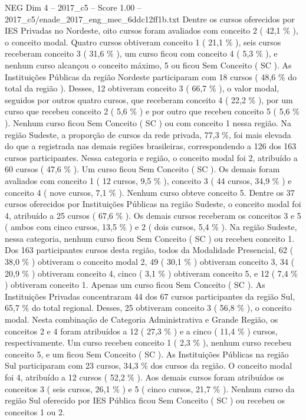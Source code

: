 \begin{textsample}{NEG Dim 4 – 2017\_c5 – Score 1.00 – 2017\_c5/enade\_2017\_eng\_mec\_6ddc12ff1b.txt}
Dentre os cursos oferecidos por IES Privadas no Nordeste, oito cursos foram avaliados com conceito 2 ( 42,1 \% ), o conceito modal.
Quatro cursos obtiveram conceito 1 ( 21,1 \% ), seis cursos receberam conceito 3 ( 31,6 \% ), um curso ficou com conceito 4 ( 5,3 \% ), e nenhum curso alcançou o conceito máximo, 5 ou ficou Sem Conceito ( SC ).
As Instituições Públicas da região Nordeste participaram com 18 cursos ( 48,6 \% do total da região ).
Desses, 12 obtiveram conceito 3 ( 66,7 \% ), o valor modal, seguidos por outros quatro cursos, que receberam conceito 4 ( 22,2 \% ), por um curso que recebeu conceito 2 ( 5,6 \% ) e por outro que recebeu conceito 5 ( 5,6 \% ).
Nenhum curso ficou Sem Conceito ( SC ) ou com conceito 1 nessa região.
Na região Sudeste, a proporção de cursos da rede privada, 77,3 \%, foi mais elevada do que a registrada nas demais regiões brasileiras, correspondendo a 126 dos 163 cursos participantes.
Nessa categoria e região, o conceito modal foi 2, atribuído a 60 cursos ( 47,6 \% ).
Um curso ficou Sem Conceito ( SC ).
Os demais foram avaliados com conceito 1 ( 12 cursos, 9,5 \% ), conceito 3 ( 44 cursos, 34,9 \% ) e conceito 4 ( nove cursos, 7,1 \% ).
Nenhum curso obteve conceito 5.
Dentre os 37 cursos oferecidos por Instituições Públicas na região Sudeste, o conceito modal foi 4, atribuído a 25 cursos ( 67,6 \% ).
Os demais cursos receberam os conceitos 3 e 5 ( ambos com cinco cursos, 13,5 \% ) e 2 ( dois cursos, 5,4 \% ).
Na região Sudeste, nessa categoria, nenhum curso ficou Sem Conceito ( SC ) ou recebeu conceito 1.
Dos 163 participantes cursos desta região, todos da Modalidade Presencial, 62 ( 38,0 \% ) obtiveram o conceito modal 2, 49 ( 30,1 \% ) obtiveram conceito 3, 34 ( 20,9 \% ) obtiveram conceito 4, cinco ( 3,1 \% ) obtiveram conceito 5, e 12 ( 7,4 \% ) obtiveram conceito 1.
Apenas um curso ficou Sem Conceito ( SC ).
As Instituições Privadas concentraram 44 dos 67 cursos participantes da região Sul, 65,7 \% do total regional.
Desses, 25 obtiveram conceito 3 ( 56,8 \% ), o conceito modal.
Nesta combinação de Categoria Administrativa e Grande Região, os conceitos 2 e 4 foram atribuídos a 12 ( 27,3 \% ) e a cinco ( 11,4 \% ) cursos, respectivamente.
Um curso recebeu conceito 1 ( 2,3 \% ), nenhum curso recebeu conceito 5, e um ficou Sem Conceito ( SC ).
As Instituições Públicas na região Sul participaram com 23 cursos, 34,3 \% dos cursos da região.
O conceito modal foi 4, atribuído a 12 cursos ( 52,2 \% ).
Aos demais cursos foram atribuídos os conceitos 3 ( seis cursos, 26,1 \% ) e 5 ( cinco cursos, 21,7 \% ).
Nenhum curso da região Sul oferecido por IES Pública ficou Sem Conceito ( SC ) ou recebeu os conceitos 1 ou 2.

\end{textsample}
